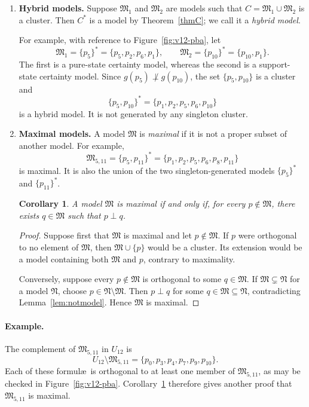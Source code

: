 \documentclass{article}   	%
\theoremstyle{plain}
\newtheorem{corollary}[theorem]{Corollary}
\theoremstyle{definition}
\theoremstyle{remark}
\begin{document}
\begin{enumerate}
\item
\textbf{Hybrid models.}
Suppose $\mathfrak M_1$ and $\mathfrak M_2$ are models such that
$C=\mathfrak M_1\cup\mathfrak M_2$ is a cluster.
Then $C^*$ is a model by Theorem~\ref{thmC}; we call it a \emph{hybrid model}.

For example, with reference to Figure~\ref{fig:v12-pba}, let
\[
\mathfrak M_1=\{p_5\}^*=\{p_5,p_2,p_6,p_1\},
\qquad
\mathfrak M_2=\{p_{10}\}^*=\{p_{10},p_1\}.
\]
The first is a pure-state certainty model, whereas the second is a
support-state certainty model.
Since $g(p_5)\not\perp g(p_{10})$, the set $\{p_5,p_{10}\}$ is a cluster and
\[
\{p_5,p_{10}\}^*
=\{p_1,p_2,p_5,p_6,p_{10}\}
\]
is a hybrid model.
It is not generated by any singleton cluster.

\item
\textbf{Maximal models.}
A model $\mathfrak M$ is \emph{maximal} if it is not a proper subset of another
model.
For example,
\[
\mathfrak M_{5,11}
=\{p_5,p_{11}\}^*
=\{p_1,p_2,p_5,p_6,p_8,p_{11}\}
\]
is maximal.
It is also the union of the two singleton-generated models $\{p_5\}^*$ and
$\{p_{11}\}^*$.

\begin{corollary}
\label{maxmod}
A model $\mathfrak M$ is maximal if and only if, for every
$p\notin\mathfrak M$, there exists $q\in\mathfrak M$ such that $p\perp q$.
\end{corollary}

\begin{proof}
Suppose first that $\mathfrak M$ is maximal and let $p\notin\mathfrak M$.
If $p$ were orthogonal to no element of $\mathfrak M$, then
$\mathfrak M\cup\{p\}$ would be a cluster.
Its extension would be a model containing both $\mathfrak M$ and $p$, contrary
to maximality.

Conversely, suppose every $p\notin\mathfrak M$ is orthogonal to some
$q\in\mathfrak M$.
If $\mathfrak M\subsetneq\mathfrak N$ for a model $\mathfrak N$, choose
$p\in\mathfrak N\setminus\mathfrak M$.
Then $p\perp q$ for some $q\in\mathfrak M\subseteq\mathfrak N$, contradicting
Lemma~\ref{lem:notmodel}.
Hence $\mathfrak M$ is maximal.
\end{proof}
\end{enumerate}

\paragraph{Example.}
The complement of $\mathfrak M_{5,11}$ in $U_{12}$ is
\[
U_{12}\setminus\mathfrak M_{5,11}
=\{p_0,p_3,p_4,p_7,p_9,p_{10}\}.
\]
Each of these formul\ae\ is orthogonal to at least one member of
$\mathfrak M_{5,11}$, as may be checked in Figure~\ref{fig:v12-pba}.
Corollary~\ref{maxmod} therefore gives another proof that
$\mathfrak M_{5,11}$ is maximal.
\end{document}
